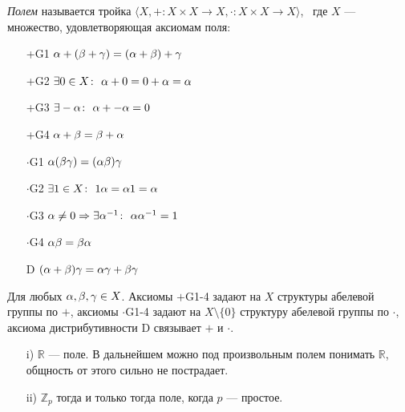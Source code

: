 \begin{definition}
    \textit{Полем} называется тройка $\langle X, + \colon X \times X \to X,
    \cdot \colon X \times X \to X \rangle$, \, где $X$ --- множество,
    удовлетворяющая аксиомам поля:
    \begin{itemize}
        \item[+G1] $\alpha + (\beta + \gamma) = (\alpha + \beta) + \gamma$
        \item[+G2] $\exists 0 \in X \colon~ \alpha + 0 = 0 + \alpha = \alpha$
        \item[+G3] $\exists -\alpha \colon~ \alpha + -\alpha = 0$
        \item[+G4] $\alpha + \beta = \beta + \alpha$
        \item[$\cdot$G1] $\alpha(\beta\gamma) = (\alpha\beta)\gamma$
        \item[$\cdot$G2] $\exists 1 \in X \colon~ 1\alpha = \alpha1 = \alpha$
        \item[$\cdot$G3] $\alpha \neq 0 \Rightarrow \exists \alpha^{-1} \colon~
         \alpha\alpha^{-1} = 1$
        \item[$\cdot$G4] $\alpha\beta = \beta\alpha$
        \item[D] $(\alpha + \beta)\gamma = \alpha\gamma + \beta\gamma$
    \end{itemize}
Для любых $\alpha, \beta, \gamma \in X$. Аксиомы $+$G1-4 задают на $X$ структуры
абелевой группы по $+$, аксиомы $\cdot$G1-4 задают на $X \setminus \{0\}$
структуру абелевой группы по $\cdot$, аксиома дистрибутивности D связывает $+$
и $\cdot$.
\end{definition}
\begin{examples}
    \enewline
    \begin{enumerate}
        \item[i)] $\mathbb{R}$ --- поле. В дальнейшем можно под произвольным полем
        понимать $\mathbb{R}$, общность от этого сильно не пострадает.
        \item[ii)] $\mathbb{Z}_p$ тогда и только тогда поле, когда $p$ --- простое.
    \end{enumerate}
\end{examples}

